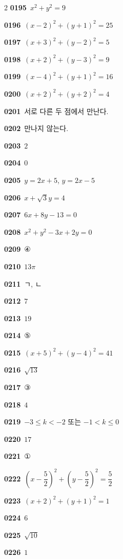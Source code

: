\documentclass[10pt,a4paper]{article}
\begin{document}
\begin{multicols}{2}
\noindent\textbf{0195}\ $x^2+y^2=9$\par
\noindent\textbf{0196}\ $(x-2)^2+(y+1)^2=25$\par
\noindent\textbf{0197}\ $(x+3)^2+(y-2)^2=5$\par
\noindent\textbf{0198}\ $(x+2)^2+(y-3)^2=9$\par
\noindent\textbf{0199}\ $(x-4)^2+(y+1)^2=16$\par
\noindent\textbf{0200}\ $(x+2)^2+(y+2)^2=4$\par
\noindent\textbf{0201}\ 서로 다른 두 점에서 만난다.\par
\noindent\textbf{0202}\ 만나지 않는다.\par
\noindent\textbf{0203}\ $2$\par
\noindent\textbf{0204}\ $0$\par
\noindent\textbf{0205}\ $y=2x+5$, $y=2x-5$\par
\noindent\textbf{0206}\ $x+\sqrt{3}y=4$\par
\noindent\textbf{0207}\ $6x+8y-13=0$\par
\noindent\textbf{0208}\ $x^2+y^2-3x+2y=0$\par
\noindent\textbf{0209}\ ④\par
\noindent\textbf{0210}\ $13\pi$\par
\noindent\textbf{0211}\ ㄱ, ㄴ\par
\noindent\textbf{0212}\ $7$\par
\noindent\textbf{0213}\ $19$\par
\noindent\textbf{0214}\ ⑤\par
\noindent\textbf{0215}\ $(x+5)^2+(y-4)^2=41$\par
\noindent\textbf{0216}\ $\sqrt{13}$\par
\noindent\textbf{0217}\ ③\par
\noindent\textbf{0218}\ $4$\par
\noindent\textbf{0219}\ $-3\le k<-2$ 또는 $-1<k\le 0$\par
\noindent\textbf{0220}\ $17$\par
\noindent\textbf{0221}\ ①\par
\noindent\textbf{0222}\ $\left(x-\dfrac{5}{2}\right)^2+\left(y-\dfrac{5}{2}\right)^2=\dfrac{5}{2}$\par
\noindent\textbf{0223}\ $(x+2)^2+(y+1)^2=1$\par
\noindent\textbf{0224}\ $6$\par
\noindent\textbf{0225}\ $\sqrt{10}$\par
\noindent\textbf{0226}\ $1$\par

\end{multicols}
\end{document}
